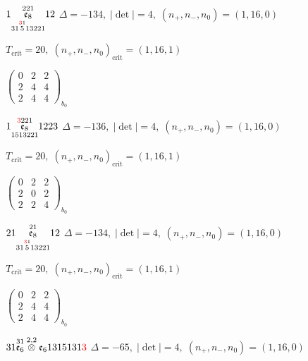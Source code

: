 \documentclass[10pt]{article}
\begin{document}
$1\overset{221}{\underset{31\overset{\textcolor{red}{3}1}{5}13221}{\mathfrak{e}_8}}12$ \quad $\Delta=-134,\; |\det|=4,\; (n_+,n_-,n_0)=(1,16,0)$

\hspace{1em}$T_{\text{crit}}=20,\; (n_+,n_-,n_0)_{\text{crit}}=(1,16,1)$

\hspace{2em}$\left(\begin{smallmatrix}0 & 2 & 2 \\ 2 & 4 & 4 \\ 2 & 4 & 4\end{smallmatrix}\right)_{\!b_0}$

\smallskip

$1\overset{\textcolor{red}{3}221}{\underset{1513221}{\mathfrak{e}_8}}1223$ \quad $\Delta=-136,\; |\det|=4,\; (n_+,n_-,n_0)=(1,16,0)$

\hspace{1em}$T_{\text{crit}}=20,\; (n_+,n_-,n_0)_{\text{crit}}=(1,16,1)$

\hspace{2em}$\left(\begin{smallmatrix}0 & 2 & 2 \\ 2 & 0 & 2 \\ 2 & 2 & 4\end{smallmatrix}\right)_{\!b_0}$

\smallskip

$21\overset{21}{\underset{31\overset{\textcolor{red}{3}1}{5}13221}{\mathfrak{e}_8}}12$ \quad $\Delta=-134,\; |\det|=4,\; (n_+,n_-,n_0)=(1,16,0)$

\hspace{1em}$T_{\text{crit}}=20,\; (n_+,n_-,n_0)_{\text{crit}}=(1,16,1)$

\hspace{2em}$\left(\begin{smallmatrix}0 & 2 & 2 \\ 2 & 4 & 4 \\ 2 & 4 & 4\end{smallmatrix}\right)_{\!b_0}$

\smallskip

$31\overset{31}{\mathfrak{e}_6}\overset{2,2}{\otimes}\mathfrak{e}_61315131\textcolor{red}{3}$ \quad $\Delta=-65,\; |\det|=4,\; (n_+,n_-,n_0)=(1,16,0)$
\end{document}
